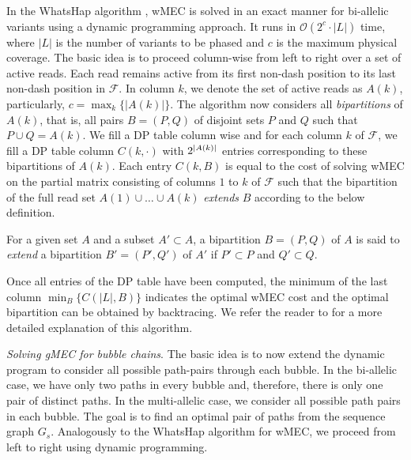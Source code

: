In the WhatsHap algorithm \citep{patterson2014whatshap}, wMEC is solved in an exact manner for bi-allelic variants using a dynamic programming approach.
It runs in $\mathcal{O}(2^c\cdot |L|)$ time, where $|L|$ is the number of variants to be phased and $c$ is the maximum physical coverage.
The basic idea is to proceed column-wise from left to right over a set of active reads.
Each read remains active from its first non-dash position to its last non-dash position in $\mathcal{F}$.
In column $k$, we denote the set of active reads as $A(k)$, particularly, $c=\max_{k}\{|A(k)|\}$.
The algorithm now considers all \emph{bipartitions} of $A(k)$, that is, all pairs $B=(P,Q)$ of disjoint sets $P$ and $Q$ such that $P\cup Q=A(k)$.
We fill a DP table column wise and for each column $k$ of $\mathcal{F}$, we fill a DP table column $C(k,\cdot)$ with $2^{\left\lvert A(k) \right\rvert}$ entries corresponding to these bipartitions of $A(k)$.
Each entry $C(k,B)$ is equal to the cost of solving wMEC on the partial matrix consisting of columns $1$ to $k$ of $\mathcal{F}$ such that the bipartition of the full read set $A(1)\cup\ldots\cup A(k)$ \emph{extends} $B$ according to the below definition.
\begin{definition}
For a given set $A$ and a subset $A'\subset A$, a bipartition $B=(P,Q)$ of $A$ is said to \emph{extend} a bipartition $B'=(P',Q')$ of $A'$ if $P'\subset P$ and $Q'\subset Q$.
\end{definition}

Once all entries of the DP table have been computed, the minimum of the last column $\min_B\{C(|L|,B)\}$ indicates the optimal wMEC cost and the optimal bipartition can be obtained by backtracing.
We refer the reader to \cite{patterson2014whatshap} for a more detailed explanation of this algorithm.

\textit{Solving gMEC for bubble chains}. The basic idea is to now extend the dynamic program to consider all possible path-pairs through each bubble. 
In the bi-allelic case, we have only two paths in every bubble and, therefore, there is only one pair of distinct paths.
In the multi-allelic case, we consider all possible path pairs in each bubble.
The goal is to find an optimal pair of paths from the sequence graph $G_s$.
Analogously to the WhatsHap algorithm for wMEC, we proceed from left to right using dynamic programming.  

